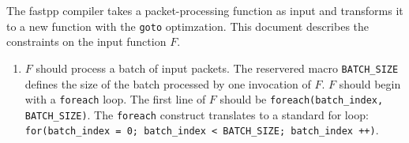 The fastpp compiler takes a packet-processing function as input and 
transforms it to a new function with the \texttt{goto} optimzation. This document 
describes the constraints on the input function $F$.

\begin{enumerate}
\item $F$ should process a batch of input packets. The reservered macro
\texttt{BATCH\_SIZE} defines the size of the batch processed by one invocation
of $F$. $F$ should begin with a \texttt{foreach} loop. The first line of $F$ should be
\texttt{foreach(batch\_index, BATCH\_SIZE)}. The \texttt{foreach} construct
translates to a standard for loop: 
\texttt{for(batch\_index = 0; batch\_index < BATCH\_SIZE; batch\_index ++)}.



\end{enumerate}
